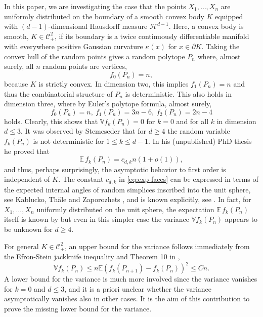 \documentclass[12pt]{article}
\def\E{{\mathds E}}
\def\V{{\mathds V}}
\def\cC{{\mathcal C}}
\def\cH{{\mathcal H}}
\def\k{{\kappa}}
\def\bd{{\partial}}
\theoremstyle{definition}
\begin{document}
\medskip
In this paper, we are investigating the case that the points $X_1,\dots,X_n$ are uniformly distributed on the boundary of a smooth convex body $K$ equipped with $(d-1)$-dimensional Hausdorff measure $\cH^{d-1}$. Here, a convex body is smooth, $K \in \cC^2_+$, if its boundary is a twice continuously differentiable manifold with everywhere positive Gaussian curvature $\k(x)$ for $x\in \bd K$. Taking the convex hull of the random points gives a random polytope $P_n$ where, almost surely, all $n$ random points are vertices,
$$ f_0(P_n)=n ,$$
because $K$ is strictly convex. In dimension two, this implies $f_1(P_n)=n$ and thus the combinatorial structure of $P_n$ is deterministic. This also holds in dimension three, where by Euler's polytope formula, almost surely, 
$$f_0(P_n) = n,\ f_1(P_n)= 3n-6,\ f_2(P_n) = 2n-4 $$
holds. Clearly, this shows that $\V f_k(P_n)=0$ for $k=0$ and for all $k$ in dimension $d \leq 3$.
It was observed by Stemeseder \cite{Stemeseder} that for $d \geq 4$ the random variable $f_k (P_n)$ is not deterministic for $1 \leq k  \leq d-1$. In his (unpublished) PhD thesis he proved that
\begin{equation} \label{eq:exp-faces}
\E \, f_{k } (P_n) = c_{d,k } n(1+ o(1)),
\end{equation}
and thus, perhaps surprisingly, the asymptotic behavior to first order is independent of $K$. The constant $c_{d,k}$ in \eqref{eq:exp-faces} can be expressed in terms of the expected internal angles of random simplices inscribed into the unit sphere, see Kablucko, Thäle and Zaporozhets \cite[Remark 1.9]{KTZ20}, and is known explicitly, see \cite{Kab21, Kab23}. In fact, for $X_1,\dots,X_n$ uniformly distributed on the unit sphere, the expectation $\E\,f_k(P_n)$ itself is known by \cite[Thm. 1.3]{KTZ20} but even in this simpler case the variance $\V f_k(P_n)$ appears to be unknown for $d\ge 4$.

For general $K\in \cC^2_+$, an upper bound for the variance follows immediately from the Efron-Stein jackknife inequality and Theorem 10 in \cite{Re03}, 
\begin{equation} \label{eq:var-upper}
\V f_k (P_n) \leq n \E (f_k (P_{n+1})-f_k (P_n))^2  \leq C n .
\end{equation}
A lower bound for the variance is much more involved since the variance vanishes for $k=0$ and $d \leq 3$, and it is a priori unclear whether the variance asymptotically vanishes also in other cases.
It is the aim of this contribution to prove the missing lower bound for the variance.
\end{document}
